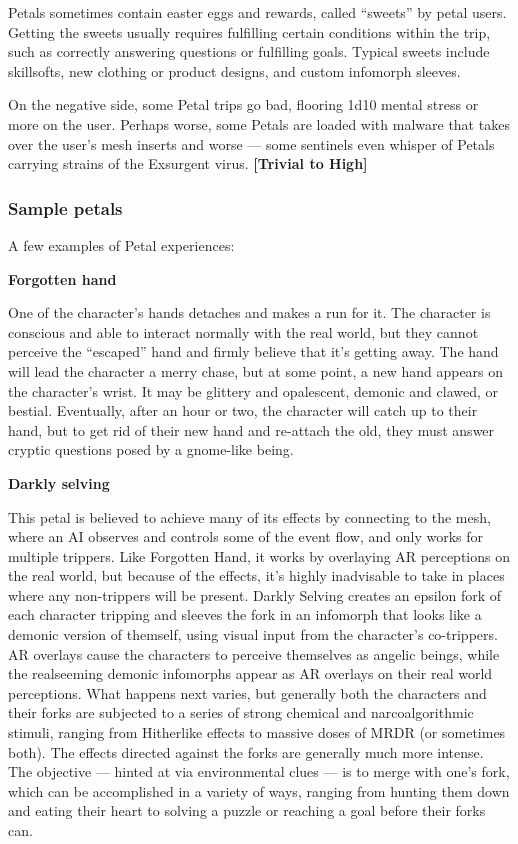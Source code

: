 Petals sometimes contain easter eggs and rewards, called ``sweets'' by petal users. Getting the sweets usually requires fulfilling certain conditions within the trip, such as correctly answering questions or fulfilling goals. Typical sweets include skillsofts, new clothing or product designs, and custom infomorph sleeves.

On the negative side, some Petal trips go bad, flooring 1d10 mental stress or more on the user. Perhaps worse, some Petals are loaded with malware that takes over the user’s mesh inserts and worse --- some sentinels even whisper of Petals carrying strains of the Exsurgent virus. \textbf{[Trivial to High]}

\subsubsection{Sample petals}

A few examples of Petal experiences:

\textbf{Forgotten hand}

One of the character’s hands detaches and makes a run for it. The character is conscious and able to interact normally with the real world, but they cannot perceive the ``escaped'' hand and firmly believe that it’s getting away. The hand will lead the character a merry chase, but at some point, a new hand appears on the character’s wrist. It may be glittery and opalescent, demonic and clawed, or bestial. Eventually, after an hour or two, the character will catch up to their hand, but to get rid of their new hand and re-attach the old, they must answer cryptic questions posed by a gnome-like being.

\textbf{Darkly selving}

This petal is believed to achieve many of its effects by connecting to the mesh, where an AI observes and controls some of the event flow, and only works for multiple trippers. Like Forgotten Hand, it works by overlaying AR perceptions on the real world, but because of the effects, it’s highly inadvisable to take in places where any non-trippers will be present. Darkly Selving creates an epsilon fork of each character tripping and sleeves the fork in an infomorph that looks like a demonic version of themself, using visual input from the character’s co-trippers. AR overlays cause the characters to perceive themselves as angelic beings, while the realseeming demonic infomorphs appear as AR overlays on their real world perceptions. What happens next varies, but generally both the characters and their forks are subjected to a series of strong chemical and narcoalgorithmic stimuli, ranging from Hitherlike effects to massive doses of MRDR (or sometimes both). The effects directed against the forks are generally much more intense. The objective --- hinted at via environmental clues --- is to merge with one’s fork, which can be accomplished in a variety of ways, ranging from hunting them down and eating their heart to solving a puzzle or reaching a goal before their forks can.

